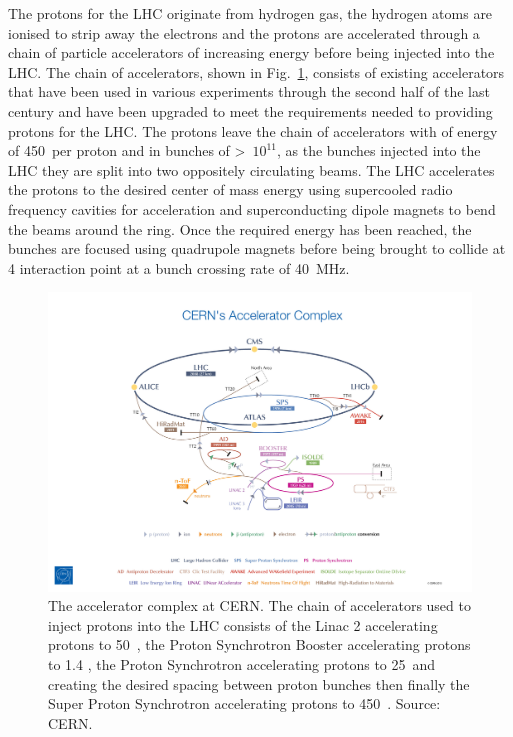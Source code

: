 The protons for the LHC originate from hydrogen gas, %
the hydrogen atoms are ionised to strip away the electrons and the protons are accelerated through a chain of particle accelerators of increasing energy before being injected into the LHC. The chain of accelerators, shown in Fig.~\ref{fig:accelerator_chain}, consists of existing accelerators that have been used in various experiments through the second half of the last century and have been upgraded to meet the requirements needed to providing protons for the LHC. 
The protons leave the chain of accelerators with of energy of 450~\gev per proton and in bunches of >~$10^{11}$, as the bunches injected into the LHC they are split into two oppositely circulating beams.
The LHC accelerates the protons to the desired center of mass energy using supercooled radio frequency cavities for acceleration and superconducting dipole magnets to bend the beams around the ring. %
Once the required energy has been reached, the bunches are focused using quadrupole magnets before being brought to collide at 4 interaction point at a bunch crossing rate of 40~MHz. 


\begin{figure}[htbp!] 
  \centering    
  \includegraphics[trim = 125mm 2mm 125mm 90mm, clip, width=1.0\textwidth]{./Figs/LHC_LHCb/accelerator_complex.jpg}
  \caption{The accelerator complex at CERN. The chain of accelerators used to inject protons into the LHC consists of the Linac 2 accelerating protons to 50~\mev, the Proton Synchrotron Booster accelerating protons to 1.4 \gev, the Proton Synchrotron accelerating protons to 25~\gev and creating the desired spacing between proton bunches then finally the Super Proton Synchrotron accelerating protons to 450~\gev. Source: CERN.}
  \label{fig:accelerator_chain}
\end{figure}




